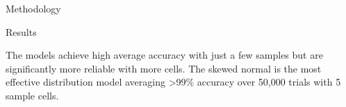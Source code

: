 \documentclass[a0paper,portrait]{baposter}
\begin{document}
\begin{poster}
\begin{posterbox}[name=method,span=2,column=1,below=intro]{Methodology}
\end{posterbox}

\begin{posterbox}[name=results,span=2,column=1,below=method]{Results}
  
\begin{minipage}[t]{0.235\linewidth}
  \vspace{0pt}
  
\end{minipage}
\begin{minipage}[t]{0.285\linewidth}
  \vspace{0pt}
  
\end{minipage}
\begin{minipage}[t]{0.23\linewidth}
  \vspace{0pt}
  
\end{minipage}
\begin{minipage}[t]{0.23\linewidth}
  \vspace{-5pt}
  
\end{minipage}


\begin{minipage}[t]{0.5\linewidth}
  \vspace{-2.5pt}
  \begin{description}
  The models achieve high average accuracy with just a few samples but are significantly more reliable with more cells. 
  The skewed normal is the most effective distribution model averaging >99\% accuracy over 50,000 trials with 5 sample cells. 
  \end{description}
\end{minipage}
\begin{minipage}[t]{0.5\linewidth}
  \vspace{0pt}
  
\end{minipage}

\end{posterbox}


\end{poster}
\end{document}
